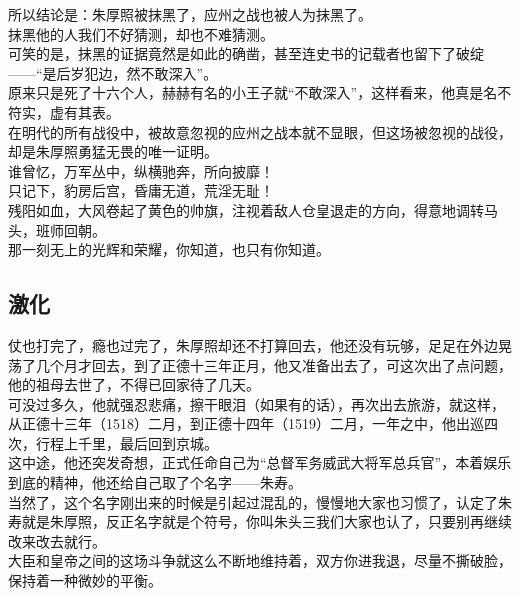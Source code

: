 \begin{multicols}{\theparacolNo}
所以结论是：朱厚照被抹黑了，应州之战也被人为抹黑了。\\

抹黑他的人我们不好猜测，却也不难猜测。\\

可笑的是，抹黑的证据竟然是如此的确凿，甚至连史书的记载者也留下了破绽——“是后岁犯边，然不敢深入”。\\

原来只是死了十六个人，赫赫有名的小王子就“不敢深入”，这样看来，他真是名不符实，虚有其表。\\

在明代的所有战役中，被故意忽视的应州之战本就不显眼，但这场被忽视的战役，却是朱厚照勇猛无畏的唯一证明。\\

谁曾忆，万军丛中，纵横驰奔，所向披靡！\\

只记下，豹房后宫，昏庸无道，荒淫无耻！\\

残阳如血，大风卷起了黄色的帅旗，注视着敌人仓皇退走的方向，得意地调转马头，班师回朝。\\

那一刻无上的光辉和荣耀，你知道，也只有你知道。\\

\subsection{激化}
仗也打完了，瘾也过完了，朱厚照却还不打算回去，他还没有玩够，足足在外边晃荡了几个月才回去，到了正德十三年正月，他又准备出去了，可这次出了点问题，他的祖母去世了，不得已回家待了几天。\\

可没过多久，他就强忍悲痛，擦干眼泪（如果有的话），再次出去旅游，就这样，从正德十三年（1518）二月，到正德十四年（1519）二月，一年之中，他出巡四次，行程上千里，最后回到京城。\\

这中途，他还突发奇想，正式任命自己为“总督军务威武大将军总兵官”，本着娱乐到底的精神，他还给自己取了个名字——朱寿。\\

当然了，这个名字刚出来的时候是引起过混乱的，慢慢地大家也习惯了，认定了朱寿就是朱厚照，反正名字就是个符号，你叫朱头三我们大家也认了，只要别再继续改来改去就行。\\

大臣和皇帝之间的这场斗争就这么不断地维持着，双方你进我退，尽量不撕破脸，保持着一种微妙的平衡。\\


\end{multicols}
